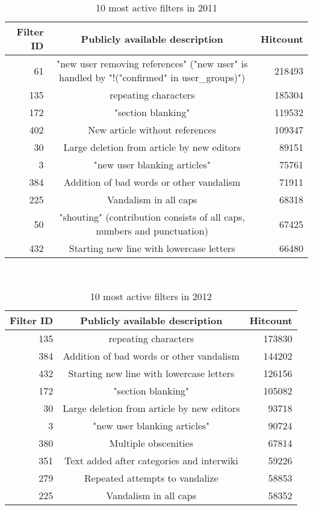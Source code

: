 \begin{table}
  \centering
  \begin{tabular}{r c r }
    Filter ID & Publicly available description & Hitcount \\
    \hline
    61 & "new user removing references" ("new user" is handled by "!("confirmed" in user\_groups)") & 218493 \\
    135 & repeating characters & 185304 \\
    172 & "section blanking" & 119532 \\
    402 & New article without references & 109347 \\
    30 & Large deletion from article by new editors & 89151 \\
    3 & "new user blanking articles" & 75761 \\
    384 & Addition of bad words or other vandalism & 71911 \\
    225 & Vandalism in all caps & 68318 \\
    50 & "shouting" (contribution consists of all caps, numbers and punctuation) & 67425 \\
    432 & Starting new line with lowercase letters & 66480 \\
  \end{tabular}
  \caption{10 most active filters in 2011}~\label{tab:app-most-active-2011}
\end{table}

\begin{table}
  \centering
  \begin{tabular}{r c r }
    Filter ID & Publicly available description & Hitcount \\
    \hline
    135 & repeating characters & 173830 \\
    384 & Addition of bad words or other vandalism & 144202 \\
    432 & Starting new line with lowercase letters & 126156 \\
    172 & "section blanking" & 105082 \\
    30 & Large deletion from article by new editors & 93718 \\
    3 & "new user blanking articles" & 90724 \\
    380 & Multiple obscenities & 67814 \\
    351 & Text added after categories and interwiki & 59226 \\
    279 & Repeated attempts to vandalize & 58853 \\
    225 & Vandalism in all caps & 58352 \\
  \end{tabular}
  \caption{10 most active filters in 2012}~\label{tab:app-most-active-2012}
\end{table}

